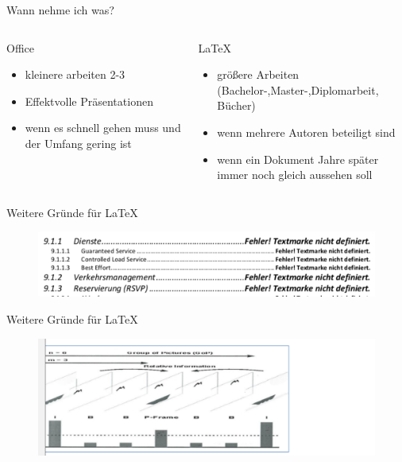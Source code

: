 \begin{frame}{Wann nehme ich was?}
	\begin{columns}
	\centering
		\begin{column}{0.45\textwidth}
			Office
			\begin{itemize}[<+->]
			\item kleinere arbeiten 2-3
			\item Effektvolle Präsentationen
			\item wenn es schnell gehen muss und der Umfang gering ist
			\end{itemize}
		\end{column}
		\begin{column}{0.45\textwidth}
			\LaTeX
			\begin{itemize}[<+->]
			\item größere Arbeiten (Bachelor-,Master-,Diplomarbeit, Bücher)
			\item wenn mehrere Autoren beteiligt sind
			\item wenn ein Dokument Jahre später immer noch gleich aussehen soll
			\end{itemize}
		\end{column}
	\end{columns}
\end{frame}
\begin{frame}{Weitere Gründe für \LaTeX}
	\begin{figure}[tbph]
		\centering
		\includegraphics[width=0.9\linewidth]{./pictures/hoeller1}
		\label{fig:hoeller1}
	\end{figure}
\end{frame}
\begin{frame}{Weitere Gründe für \LaTeX}
	\begin{figure}[tbph]
		\centering
		\includegraphics[width=0.9\linewidth]{./pictures/hoeller2}
		\label{fig:hoeller2}
	\end{figure}
\end{frame}
